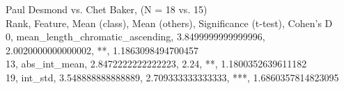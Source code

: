 Paul Desmond vs. Chet Baker, (N = 18 vs. 15)\\
Rank, Feature, Mean (class), Mean (others), Significance (t-test), Cohen's D\\
0, mean_length_chromatic_ascending, 3.8499999999999996, 2.0020000000000002, **, 1.1863098494700457\\
13, abs_int_mean, 2.8472222222222223, 2.24, **, 1.1800352639611182\\
19, int_std, 3.548888888888889, 2.709333333333333, ***, 1.6860357814823095\\
